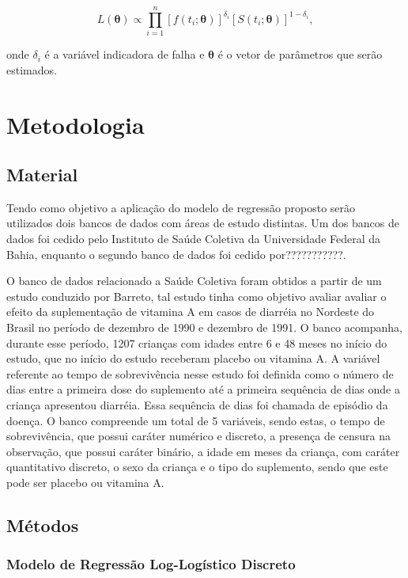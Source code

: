 \documentclass[
	article,
	12pt,				%
	openright,			%
	twoside,			%
	a4paper,			%
	english,			%
	french,				%
	spanish,			%
	brazil				%
	]{abntex2}
\begin{document}
\begin{equation} \label{eq:maxv1}
  L(\boldsymbol{\theta}) \propto \prod_{i=1}^n \left[f(t_i;\boldsymbol{\theta})\right]^{\delta_i} \left[S(t_i;\boldsymbol{\theta})\right]^{1-\delta_i}, 
\end{equation}

onde $\delta_i$ é a variável indicadora de falha e $\boldsymbol{\theta}$ é o vetor de parâmetros que serão estimados.

\section{Metodologia}
\subsection{Material}

Tendo como objetivo a aplicação do modelo de regressão proposto serão utilizados dois bancos de dados com áreas de estudo distintas. Um dos bancos de dados foi cedido pelo Instituto de Saúde Coletiva da Universidade Federal da Bahia, enquanto o segundo banco de dados foi cedido por???????????.

O banco de dados relacionado a Saúde Coletiva foram obtidos a partir de um estudo conduzido por Barreto\cite{Barreto;1994}, tal estudo tinha como objetivo avaliar avaliar o efeito da suplementação de vitamina A em casos de diarréia no Nordeste do Brasil no período de dezembro de 1990 e dezembro de 1991. O banco acompanha, durante esse período, 1207 crianças com idades entre 6 e 48 meses no início do estudo, que no início do estudo receberam placebo ou vitamina A. A variável referente ao tempo de sobrevivência nesse estudo foi definida como o número de dias entre a primeira dose do suplemento até a primeira sequência de dias onde a criança apresentou diarréia. Essa sequência de dias foi chamada de episódio da doença. O banco compreende um total de 5 variáveis, sendo estas, o tempo de sobrevivência, que possui caráter numérico e discreto, a presença de censura na observação, que possui caráter binário, a idade em meses da criança, com caráter quantitativo discreto, o sexo da criança e o tipo do suplemento, sendo que este pode ser placebo ou vitamina A.

\subsection{Métodos}

\subsubsection{Modelo de Regressão Log-Logístico Discreto}
\end{document}

